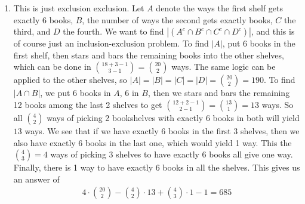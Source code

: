 \documentclass[12pt]{article}
\theoremstyle{definitionstyle}
\begin{document}
\begin{enumerate}[leftmargin=\labelsep]
		\item This is just exclusion exclusion. Let $A$ denote the ways the first shelf gets exactly 6 books, $B$, the number of ways the second gets exactly books, $C$ the third, and $D$ the fourth. We want to find $|(A^c \cap B^c \cap C^c \cap D^c)|$, and this is of course just an inclusion-exclusion problem. To find $|A|$, put 6 books in the first shelf, then stars and bars the remaining books into the other shelves, which can be done in ${18 + 3 - 1 \choose 3 - 1} = {20 \choose 2}$ ways. The same logic can be applied to the other shelves, so $|A| = |B| = |C| = |D| = {20 \choose 2} = 190$. To find $|A \cap B|$, we put 6 books in $A$, 6 in $B$, then we stars and bars the remaining 12 books among the last 2 shelves to get ${12 + 2 -1 \choose 2 - 1} = {13 \choose 1} = 13$ ways. So all ${4 \choose 2}$ ways of picking 2 bookshelves with exactly 6 books in both will yield $13$ ways. We see that if we have exactly 6 books in the first 3 shelves, then we also have exactly 6 books in the last one, which would yield 1 way. This the ${4 \choose 3} = 4$ ways of picking $3$ shelves to have exactly 6 books all give one way. Finally, there is 1 way to have exactly 6 books in all the shelves. This gives us an answer of
		\begin{align*}
			4 \cdot {20 \choose 2} - {4 \choose 2} \cdot 13 + {4 \choose 3} \cdot 1 - 1 = 685
		\end{align*}
		

\end{enumerate}
\end{document}
